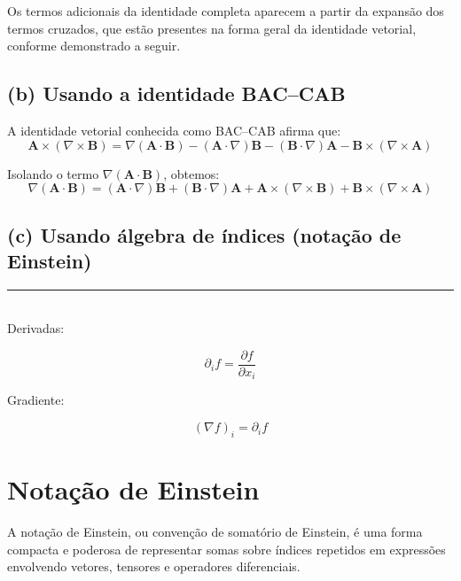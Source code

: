 \documentclass[a4paper,12pt]{article}
\begin{document}
\begin{flushleft}
Os termos adicionais da identidade completa aparecem a partir da expansão dos termos cruzados, que estão presentes na forma geral da identidade vetorial, conforme demonstrado a seguir.

\subsection*{(b) Usando a identidade BAC–CAB}

A identidade vetorial conhecida como BAC–CAB afirma que:
\begin{equation}
\mathbf{A} \times (\nabla \times \mathbf{B}) = \nabla (\mathbf{A} \cdot \mathbf{B}) - (\mathbf{A} \cdot \nabla)\mathbf{B} - (\mathbf{B} \cdot \nabla)\mathbf{A} - \mathbf{B} \times (\nabla \times \mathbf{A})
\end{equation}

Isolando o termo \( \nabla(\mathbf{A} \cdot \mathbf{B}) \), obtemos:
\begin{equation}
\nabla (\mathbf{A} \cdot \mathbf{B}) = (\mathbf{A} \cdot \nabla)\mathbf{B} + (\mathbf{B} \cdot \nabla)\mathbf{A} + \mathbf{A} \times (\nabla \times \mathbf{B}) + \mathbf{B} \times (\nabla \times \mathbf{A})
\end{equation}

\subsection*{(c) Usando álgebra de índices (notação de Einstein)}

\noindent\rule{\linewidth}{0.8pt}\\
Derivadas:

\begin{equation}
\partial_{i} f = \frac{\partial f}{\partial x_{i}}
\end{equation}

Gradiente:

\begin{equation}
(\nabla f)_{i} = \partial_{i}f
\end{equation}


\section*{Notação de Einstein}

A notação de Einstein, ou convenção de somatório de Einstein, é uma forma compacta e poderosa de representar somas sobre índices repetidos em expressões envolvendo vetores, tensores e operadores diferenciais.


\end{flushleft}
\end{document}
